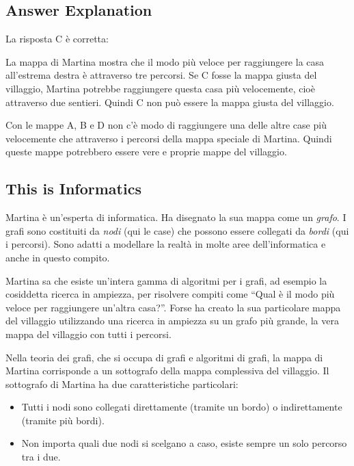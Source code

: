 \documentclass[a4paper,11pt]{report}
\newcommand{\taskGraphicsFolder}{..}
\begin{document}
\endgroup

\subsection*{Answer Explanation}

La risposta C è corretta: \raisebox{-0.5ex}{}

La mappa di Martina mostra che il modo più veloce per raggiungere la casa all’estrema destra è attraverso tre percorsi. Se C fosse la mappa giusta del villaggio, Martina potrebbe raggiungere questa casa più velocemente, cioè attraverso due sentieri. Quindi C non può essere la mappa giusta del villaggio.

Con le mappe A, B e D non c’è modo di raggiungere una delle altre case più velocemente che attraverso i percorsi della mappa speciale di Martina. Quindi queste mappe potrebbero essere vere e proprie mappe del villaggio.


\subsection*{This is Informatics}

Martina è un’esperta di informatica. Ha disegnato la sua mappa come un \emph{grafo}. I grafi sono costituiti da \emph{nodi} (qui le case) che possono essere collegati da \emph{bordi} (qui i percorsi). Sono adatti a modellare la realtà in molte aree dell’informatica e anche in questo compito.

Martina sa che esiste un’intera gamma di algoritmi per i grafi, ad esempio la cosiddetta ricerca in ampiezza, per risolvere compiti come \enquote{Qual è il modo più veloce per raggiungere un’altra casa?}. Forse ha creato la sua particolare mappa del villaggio utilizzando una ricerca in ampiezza su un grafo più grande, la vera mappa del villaggio con tutti i percorsi.

Nella teoria dei grafi, che si occupa di grafi e algoritmi di grafi, la mappa di Martina corrisponde a un sottografo della mappa complessiva del villaggio. Il sottografo di Martina ha due caratteristiche particolari:

\begin{itemize}
  \item Tutti i nodi sono collegati direttamente (tramite un bordo) o indirettamente (tramite più bordi).
  \item Non importa quali due nodi si scelgano a caso, esiste sempre un solo percorso tra i due.
\end{itemize}
\end{document}
